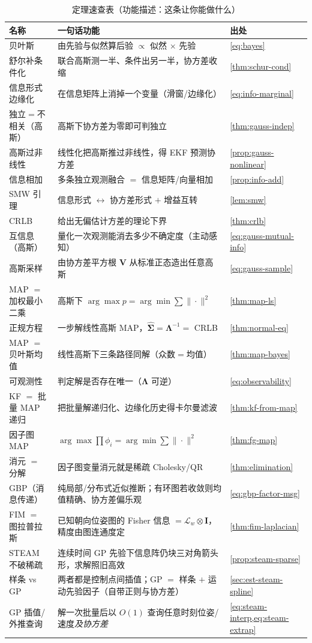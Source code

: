 \begin{table}[H]\centering\small
\caption{定理速查表（功能描述：这条让你能做什么）}
\begin{tabular}{lll}
\toprule
名称 & 一句话功能 & 出处 \\
\midrule
贝叶斯 & 由先验与似然算后验 $\propto$ 似然 $\times$ 先验 & \cref{eq:bayes} \\
舒尔补条件化 & 联合高斯测一半、条件出另一半，协方差收缩 & \cref{thm:schur-cond} \\
信息形式边缘化 & 在信息矩阵上消掉一个变量（滑窗/边缘化） & \cref{eq:info-marginal} \\
独立$=$不相关（高斯） & 高斯下协方差为零即可判独立 & \cref{thm:gauss-indep} \\
高斯过非线性 & 线性化把高斯推过非线性，得 EKF 预测协方差 & \cref{prop:gauss-nonlinear} \\
信息相加 & 多条独立观测融合 $=$ 信息矩阵/向量相加 & \cref{prop:info-add} \\
SMW 引理 & 信息形式 $\leftrightarrow$ 协方差形式 $+$ 增益互转 & \cref{lem:smw} \\
CRLB & 给出无偏估计方差的理论下界 & \cref{thm:crlb} \\
互信息（高斯） & 量化一次观测能消去多少不确定度（主动感知） & \cref{eq:gauss-mutual-info} \\
高斯采样 & 由协方差平方根 $\mathbf{V}$ 从标准正态造出任意高斯 & \cref{eq:gauss-sample} \\
MAP $=$ 加权最小二乘 & 高斯下 $\arg\max p=\arg\min\sum\|\cdot\|^2$ & \cref{thm:map-ls} \\
正规方程 & 一步解线性高斯 MAP，$\hat{\boldsymbol{\Sigma}}=\boldsymbol{\Lambda}^{-1}=$ CRLB & \cref{thm:normal-eq} \\
MAP $=$ 贝叶斯均值 & 线性高斯下三条路径同解（众数$=$均值） & \cref{thm:map-bayes} \\
可观测性 & 判定解是否存在唯一（$\boldsymbol{\Lambda}$ 可逆） & \cref{eq:observability} \\
KF $=$ 批量 MAP 递归 & 把批量解递归化、边缘化历史得卡尔曼滤波 & \cref{thm:kf-from-map} \\
因子图 MAP & $\arg\max\prod\phi_i=\arg\min\sum\|\cdot\|^2$ & \cref{thm:fg-map} \\
消元 $=$ 分解 & 因子图变量消元就是稀疏 Cholesky/QR & \cref{thm:elimination} \\
GBP（消息传递） & 纯局部/分布式近似推断；有环图若收敛则均值精确、协方差偏乐观 & \cref{eq:gbp-factor-msg} \\
FIM $=$ 图拉普拉斯 & 已知朝向位姿图的 Fisher 信息 $=\boldsymbol{\mathcal{L}}_w\otimes\mathbf{I}$，精度由图连通度定 & \cref{thm:fim-laplacian} \\
STEAM 不破稀疏 & 连续时间 GP 先验下信息阵仍块三对角箭头形，求解照旧高效 & \cref{prop:steam-sparse} \\
样条 vs GP & 两者都是控制点间插值；GP $=$ 样条 $+$ 运动先验因子（自带正则与协方差） & \cref{sec:est-steam-spline} \\
GP 插值/外推查询 & 解一次批量后以 $O(1)$ 查询任意时刻位姿/速度\emph{及协方差} & \cref{eq:steam-interp,eq:steam-extrap} \\
\bottomrule
\end{tabular}
\end{table}

